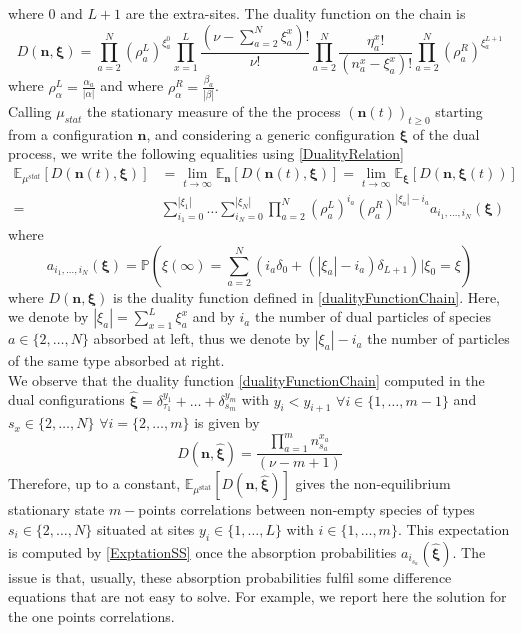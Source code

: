 \documentclass[10pt]{article}
\numberwithin{equation}{section}
\numberwithin{equation}{subsection}
\begin{document}
where $0$ and $L+1$ are the extra-sites. The duality function on the chain is
\begin{equation}\label{dualityFunctionChain}
	D(\bm{n},\bm{\xi})=\prod_{a=2}^{N}\left(\rho_{a}^{L}\right)^{\xi_{a}^{0}}\prod_{x=1}^{L}\frac{(\nu-\sum_{a=2}^{N}\xi_{a}^{x})!}{\nu!}\prod_{a=2}^{N}\frac{\eta_{a}^{x}!}{(n_{a}^{x}-\xi_{a}^{x})!}\prod_{a=2}^{N}\left(\rho_{a}^{R}\right)^{\xi_{a}^{L+1}}
\end{equation}
where $\rho_{\alpha}^{L}=\frac{\alpha_{a}}{|\alpha|}$ and where $\rho_{\alpha}^{R}=\frac{\beta_{a}}{|\beta|}$.\\
Calling $\mu_{stat}$ the stationary measure of the the process $(\bm{n}(t))_{t\geq 0}$ starting from a configuration $\bm{n}$, and considering a generic configuration $\bm{\xi}$ of the dual process, we write the following equalities using \eqref{DualityRelation}
\begin{equation}\label{ExptationSS}
	\begin{split}
		\mathbb{E}_{\mu^{stat}}\left[D(\bm{n}(t),\bm{\xi})\right]&=\lim_{t\to\infty}\mathbb{E}_{\bm{n}}\left[D(\bm{n}(t),\bm{\xi})\right]=\lim_{t\to\infty}\mathbb{E}_{\bm{\xi}}\left[D(\bm{n},\bm{\xi}(t))\right]
		\\=&
		\sum_{i_{1}=0}^{|\xi_{1}|}\ldots\sum_{i_{N}=0}^{|\xi_{N}|}\prod_{a=2}^{N}\left(\rho_{a}^{L}\right)^{i_{a}}\left(\rho_{a}^{R}\right)^{|\xi_{a}|-i_{a}}a_{i_{1},\ldots,i_{N}}(\bm{\xi})
	\end{split}
\end{equation}
where 
\begin{equation}\label{Pass}
	a_{i_{1},\ldots,i_{N}}(\bm{\xi})=\mathbb{P}\left(\xi(\infty)=\sum_{a=2}^{N}\left(i_{a}\delta_{0}+(|\xi_{a}|-i_{a})\delta_{L+1}\right)| \xi_{0}=\xi\right)
\end{equation}
where $D(\bm{n},\bm{\xi})$ is the duality function defined in \eqref{dualityFunctionChain}. Here, we denote by $|\xi_{a}|=\sum_{x=1}^{L}\xi_{a}^{x}$ and by $i_{a}$ the number of dual particles of species $a\in\{2,\ldots,N\}$ absorbed at left, thus we denote by $|\xi_{a}|-i_{a}$ the number of particles of the same type absorbed at right.\\
We observe that the duality function \eqref{dualityFunctionChain} computed in the dual configurations $\bm{\widehat{\xi}}=\delta_{\tau_{1}}^{y_{1}}+\ldots+\delta_{s_{m}}^{y_{m}}$ with $y_{i}<y_{i+1}$ $\forall i\in \{1,\ldots,m-1\}$ and $s_{x}\in \{2,\ldots,N\}$ $\forall i=\{2,\ldots,m\}$ is given by 
\begin{equation}
	D(\bm{n},\bm{\widehat{\xi}})= \frac{\prod_{a=1}^{m}n_{s_{a}}^{x_{a}}}{(\nu-m+1)}
\end{equation}
Therefore, up to a constant, $\mathbb{E}_{\mu^{\text{stat}}}\left[D(\bm{n},\bm{\widehat{\xi}})\right]$ gives the non-equilibrium stationary state $m-$points correlations between non-empty species of types $s_{i}\in\{2,\ldots,N\}$ situated at sites $y_{i}\in\{1,\ldots,L\}$ with $i\in \{1,\ldots,m\}$. This expectation is computed by \eqref{ExptationSS} once the absorption probabilities $a_{i_{s_{a}}}(\widehat{\bm{\xi}})$. The issue is that, usually, these absorption probabilities fulfil some difference equations that are not easy to solve. For example, we report here the solution for the one points correlations. 
\end{document}
